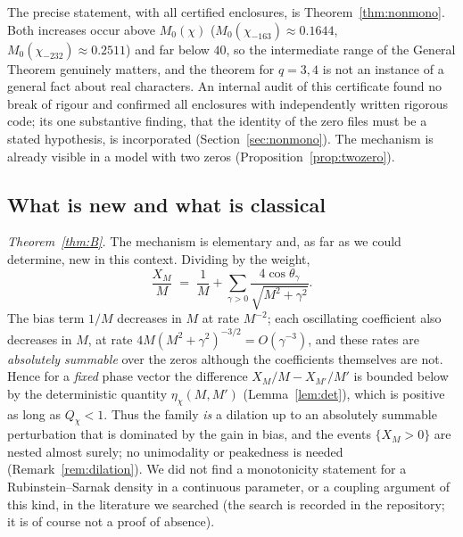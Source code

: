 \documentclass[11pt]{amsart}
\theoremstyle{definition}
\numberwithin{equation}{section}
\begin{document}
The precise statement, with all certified enclosures, is
Theorem~\ref{thm:nonmono}. Both increases occur above $M_0(\chi)$
($M_0(\chi_{-163})\approx0.1644$, $M_0(\chi_{-232})\approx0.2511$) and
far below $40$, so the intermediate range of the General Theorem
genuinely matters, and the theorem for $q=3,4$ is not an instance of a
general fact about real characters. An internal audit of this
certificate found no break of rigour and confirmed all enclosures with
independently written rigorous code; its one substantive finding, that
the identity of the zero files must be a stated hypothesis, is
incorporated (Section~\ref{sec:nonmono}). The mechanism is already visible in a model with two zeros
(Proposition~\ref{prop:twozero}).

\subsection{What is new and what is classical}

\emph{Theorem~\ref{thm:B}.} The mechanism is elementary and, as far as
we could determine, new in this context. Dividing by the weight,
\[
\frac{X_M}{M}\;=\;\frac1M+\sum_{\gamma>0}
\frac{4\cos\theta_\gamma}{\sqrt{M^2+\gamma^2}} .
\]
The bias term $1/M$ decreases in $M$ at rate $M^{-2}$; each
oscillating coefficient also decreases in $M$, at rate
$4M(M^2+\gamma^2)^{-3/2}=O(\gamma^{-3})$, and these rates are
\emph{absolutely summable} over the zeros although the coefficients
themselves are not. Hence for a \emph{fixed} phase vector the
difference $X_M/M-X_{M'}/M'$ is bounded below by the deterministic
quantity $\eta_\chi(M,M')$ (Lemma~\ref{lem:det}), which is positive
as long as $Q_\chi<1$. Thus the family \emph{is} a dilation up to an
absolutely summable perturbation that is dominated by the gain in
bias, and the events $\{X_M>0\}$ are nested almost surely; no unimodality or
peakedness is needed (Remark~\ref{rem:dilation}). We did not find a
monotonicity statement for a Rubinstein--Sarnak density \cite{RS94}
in a continuous parameter, or a coupling argument of this kind, in the
literature we searched (the search is recorded in the repository;
it is of course not a proof of absence).
\end{document}
